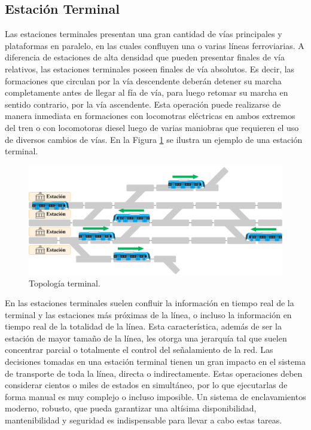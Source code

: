 \subsection{Estación Terminal}

Las estaciones terminales presentan una gran cantidad de vías principales y plataformas en paralelo, en las cuales confluyen una o varias líneas ferroviarias. A diferencia de estaciones de alta densidad que pueden presentar finales de vía relativos, las estaciones terminales poseen finales de vía absolutos. Es decir, las formaciones que circulan por la vía descendente deberán detener su marcha completamente antes de llegar al fía de vía, para luego retomar su marcha en sentido contrario, por la vía ascendente. Esta operación puede realizarse de manera inmediata en formaciones con locomotras eléctricas en ambos extremos del tren o con locomotoras diesel luego de varias maniobras que requieren el uso de diversos cambios de vías. En la Figura \ref{fig:terminal_1} se ilustra un ejemplo de una estación terminal.

    \begin{figure}[H]
        \centering
        \includegraphics[width=1\textwidth]{Figuras/terminal}
        \centering\caption{Topología terminal.}
        \label{fig:terminal_1}
    \end{figure}

En las estaciones terminales suelen confluir la información en tiempo real de la terminal y las estaciones más próximas de la línea, o incluso la información en tiempo real de la totalidad de la línea. Esta característica, además de ser la estación de mayor tamaño de la línea, les otorga una jerarquía tal que suelen concentrar parcial o totalmente el control del señalamiento de la red. Las decisiones tomadas en una estación terminal tienen un gran impacto en el sistema de transporte de toda la línea, directa o indirectamente. Estas operaciones deben considerar cientos o miles de estados en simultáneo, por lo que ejecutarlas de forma manual es muy complejo o incluso imposible. Un sistema de enclavamientos moderno, robusto, que pueda garantizar una altísima disponibilidad, mantenibilidad y seguridad es indispensable para llevar a cabo estas tareas.